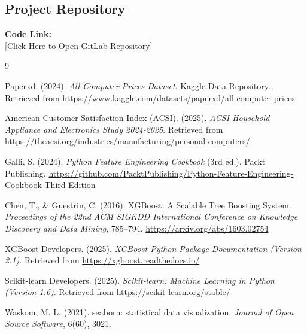 \documentclass[11pt, a4paper]{article}
\begin{document}
\subsection{Project Repository}


\vspace{0.3cm}

\noindent \textbf{Code Link:} \\
\href{https://gitlab.computing.dcu.ie/parthvijay.mhatre2/predicting-computer-prices-via-visual-user-experience-features}{[Click Here to Open GitLab Repository]}
\begin{thebibliography}{9}

    Paperxd. (2024). \textit{All Computer Prices Dataset}. Kaggle Data Repository. Retrieved from \url{https://www.kaggle.com/datasets/paperxd/all-computer-prices}

    American Customer Satisfaction Index (ACSI). (2025). \textit{ACSI Household Appliance and Electronics Study 2024-2025}. Retrieved from \url{https://theacsi.org/industries/manufacturing/personal-computers/}

    Galli, S. (2024). \textit{Python Feature Engineering Cookbook} (3rd ed.). Packt Publishing.
    \url{https://github.com/PacktPublishing/Python-Feature-Engineering-Cookbook-Third-Edition}

    Chen, T., \& Guestrin, C. (2016). XGBoost: A Scalable Tree Boosting System. \textit{Proceedings of the 22nd ACM SIGKDD International Conference on Knowledge Discovery and Data Mining}, 785–794. \url{https://arxiv.org/abs/1603.02754}

    XGBoost Developers. (2025). \textit{XGBoost Python Package Documentation (Version 2.1)}. Retrieved from \url{https://xgboost.readthedocs.io/}

    Scikit-learn Developers. (2025). \textit{Scikit-learn: Machine Learning in Python (Version 1.6)}. Retrieved from \url{https://scikit-learn.org/stable/}

    Waskom, M. L. (2021). seaborn: statistical data visualization. \textit{Journal of Open Source Software}, 6(60), 3021.

\end{thebibliography}
\end{document}
